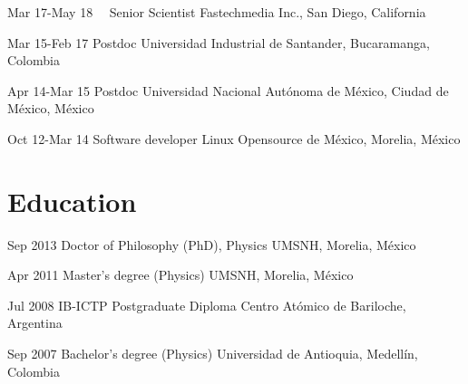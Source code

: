 \documentclass[]{friggeri-cv}
\begin{document}
\begin{entrylist}
\entry
{Mar 17-May 18\ \ }
{Senior Scientist}
{Fastechmedia Inc., San Diego, California}


\entry
{Mar 15-Feb 17}
{Postdoc}
{ Universidad Industrial de Santander, Bucaramanga, Colombia}

\entry
{Apr 14-Mar 15}
{Postdoc}
{Universidad Nacional Aut\'onoma de M\'exico, Ciudad de M\'exico, M\'exico}


\entry
{Oct 12-Mar 14}
{Software developer}
{Linux Opensource de México, Morelia, M\'exico}

    
\end{entrylist}

\section{Education}
\begin{entrylist}

  \entry
{Sep 2013}
{Doctor of Philosophy (PhD), Physics}
{UMSNH, Morelia, M\'exico} 

  \entry
{Apr 2011}
{Master's degree (Physics)}
{UMSNH, Morelia, M\'exico} 

  \entry
{Jul 2008}
{IB-ICTP Postgraduate Diploma}
{Centro At\'omico de Bariloche, Argentina}

  \entry
{Sep 2007}
{Bachelor's degree (Physics)} 
{Universidad de Antioquia, Medell\'in, Colombia}

\end{entrylist}
\end{document}
